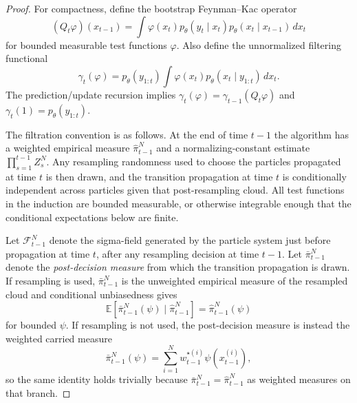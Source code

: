 \begin{proof}
For compactness, define the bootstrap Feynman--Kac operator
\[
  (Q_t\varphi)(x_{t-1})
  =
  \int \varphi(x_t)
       p_\theta(y_t\mid x_t)
       p_\theta(x_t\mid x_{t-1})\,dx_t
\]
for bounded measurable test functions $\varphi$.  Also define the unnormalized
filtering functional
\[
  \gamma_t(\varphi)
  =
  p_\theta(y_{1:t})
  \int \varphi(x_t)p_\theta(x_t\mid y_{1:t})\,dx_t .
\]
The prediction/update recursion implies
$\gamma_t(\varphi)=\gamma_{t-1}(Q_t\varphi)$ and
$\gamma_t(1)=p_\theta(y_{1:t})$.

The filtration convention is as follows.  At the end of time $t-1$ the
algorithm has a weighted empirical measure $\hat\pi_{t-1}^N$ and a
normalizing-constant estimate $\prod_{s=1}^{t-1}Z_s^N$.  Any resampling
randomness used to choose the particles propagated at time $t$ is then drawn,
and the transition propagation at time $t$ is conditionally independent across
particles given that post-resampling cloud.  All test functions in the induction
are bounded measurable, or otherwise integrable enough that the conditional
expectations below are finite.

Let $\mathcal F_{t-1}^N$ denote the sigma-field generated by the particle
system just before propagation at time $t$, after any resampling decision at
time $t-1$.  Let $\bar\pi_{t-1}^N$ denote the \emph{post-decision measure} from
which the transition propagation is drawn.  If resampling is used,
$\bar\pi_{t-1}^N$ is the unweighted empirical measure of the resampled cloud and
conditional unbiasedness gives
\[
  \mathbb E[\bar\pi_{t-1}^N(\psi)\mid \hat\pi_{t-1}^N]
  =
  \hat\pi_{t-1}^N(\psi)
\]
for bounded $\psi$.  If resampling is not used, the post-decision measure is
instead the weighted carried measure
\[
  \bar\pi_{t-1}^N(\psi)
  =
  \sum_{i=1}^N w_{t-1}^{\star(i)}\psi(x_{t-1}^{(i)}),
\]
so the same identity holds trivially because
$\bar\pi_{t-1}^N=\hat\pi_{t-1}^N$ as weighted measures on that branch.


\end{proof}
